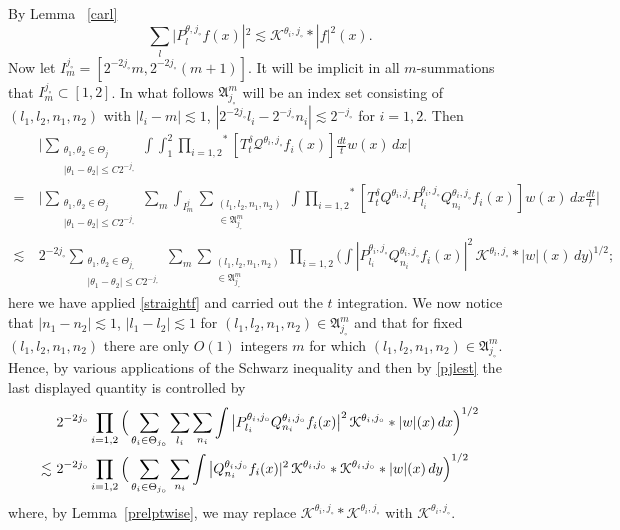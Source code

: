 \documentclass[11pt]{amsart}
\theoremstyle{definition}
\numberwithin{theorem}{section}
\numberwithin{definition}{section}
\def\prodstar{{\prod_{i=1,2}}^{\!\!*}}
\newcommand{\Be}{\begin{equation}}
\newcommand{\Ee}{\end{equation}}
\newcommand{\note}[1]{\footnote{\texttt{\Small #1}}}
\def\lc{\lesssim}
\def\fA{{\mathfrak {A}}}
\def\cK{{\mathcal {K}}}
\def\cQ{{\mathcal {Q}}}
\begin{document}
By  Lemma ~\ref{carl}
\Be\label{pjlest}\sum_l \big |P^{\theta,j_\circ}_l f(x)|^2 \lc
\cK^{\theta_i,j_{\circ}} *|f|^2 (x).
\Ee
Now let  $I_m^{j_\circ}=[2^{-2j_\circ}m,
2^{-2j_\circ}(m+1)].$ It will be implicit in all $m$-summations that
$I_m^{j_\circ}\subset[1,2]$.
In what follows $\fA^m_{j_\circ}$ will be an index set consisting of
$(l_1,l_2,n_1,n_2)$ with
$|l_i-m|\lc 1$, $|2^{-2j_{\circ}}l_i-2^{-j_\circ}n_i|\lc 2^{-j_{\circ}}$ for $i=1,2$.
 Then
\begin{align*}
&\Big|
\sum_{\substack{\theta_1, \theta_2\in\Theta_j\\ |\theta_1-\theta_2|\le C2^{-j_\circ}}}
\int \int_1^2\prodstar[T^{\delta}_t \cQ^{\theta_i,j_\circ}f_i(x)]
\frac{dt}{t}w(x)\,dx\Big|
\\
=\ &
\Big|\sum_{\substack{\theta_1, \theta_2\in\Theta_j\\ |\theta_1-\theta_2|\le C2^{-j_\circ}}}
\sum_{m}
\int_{I^j_m}
\sum_{\substack{(l_1,l_2, n_1,n_2)\\ \in \fA^m_{j_\circ}} }
\int \prodstar[
T^{\delta}_t Q^{\theta_i,j_\circ}P^{\theta_i,j_\circ}_{l_i}Q^{\theta_i,j_\circ}_{n_i}
f_i(x)] w(x)\,dx \frac{dt}{t}
\Big|
\\
\lc\ & 2^{-2j_\circ}
\sum_{\substack{\theta_1, \theta_2\in\Theta_{j_\circ}\\ |\theta_1-\theta_2|\le C2^{-j_\circ}}}
\sum_{m}\sum_{\substack{(l_1,l_2, n_1,n_2)\\ \in \fA^m_{j_\circ}} }
\prod_{i=1,2}\Big( \int |
P^{\theta_i,j_\circ}_{l_i}Q^{\theta_i,j_{\circ}}_{n_i}
f_i(x)|^2
\,\cK^{\theta_i,j_{\circ}}
*  |w|(x)\,dy\Big)^{1/2};
\end{align*}
here we have applied \eqref{straightf} and carried out the
$t$ integration.
We now notice that
$|n_1-n_2|\lc 1$, $|l_1-l_2|\lc 1$ for
$(l_1,l_2,n_1,n_2)\in \fA^m_{j_\circ}$
and that for fixed
$(l_1,l_2,n_1,n_2)$ there are only $O(1)$ integers $m$ for which
$(l_1,l_2,n_1,n_2)\in \fA^m_{j_\circ}$.
Hence,  by various applications of the Schwarz inequality  and then
by \eqref{pjlest}
the last displayed quantity  is controlled by
\begin{align}
&2^{-2j_\circ} \prod_{i=1,2}
\Big(\sum_{\theta_i\in\Theta_{j_\circ}}\sum_{l_i}\sum_{n_i}\int
\big|P^{\theta_i,j_\circ}_{l_i}Q^{\theta_i,j_{\circ}}_{n_i}
f_i(x)\big |^2
\,\cK^{\theta_i,j_{\circ}}
*  |w|(x)\,dx\Big)^{1/2}
\notag
\\
\lc\ & 2^{-2j_\circ} \prod_{i=1,2}
\Big(\sum_{\theta_i\in\Theta_{j_\circ}}\sum_{n_i}\int
\big|Q^{\theta_i,j_{\circ}}_{n_i}
f_i(x)|^2
\,\cK^{\theta_i,j_{\circ}} *\cK^{\theta_i,j_{\circ}}
*  |w|(x)\,dy\Big)^{1/2}
\label{withQjthm}
\end{align}
where, by Lemma~\ref{prelptwise}, we may replace
$\cK^{\theta_i,j_{\circ}} *\cK^{\theta_i,j_{\circ}} $
with
$\cK^{\theta_i,j_{\circ}} $.
\end{document}
